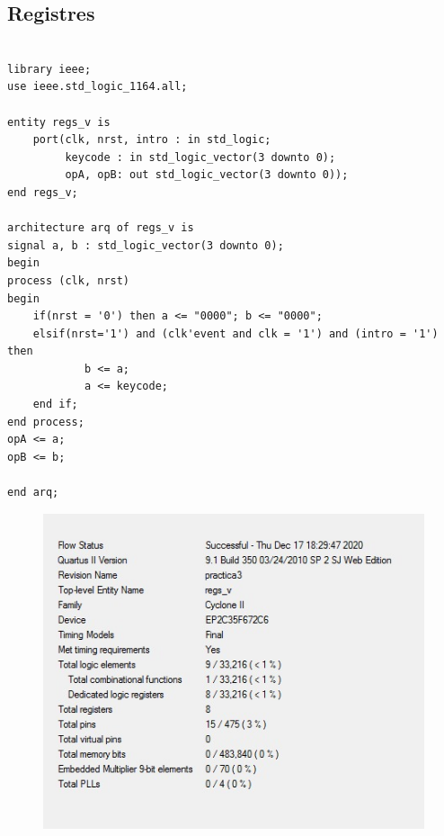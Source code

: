 \documentclass[12pt, a4papre]{article}
\begin{document}
		
\subsection{Registres}
		\begin{lstlisting}[style=vhdl, frame=single, basicstyle=\tiny]

library ieee;
use ieee.std_logic_1164.all;

entity regs_v is
	port(clk, nrst, intro : in std_logic;
		 keycode : in std_logic_vector(3 downto 0);
		 opA, opB: out std_logic_vector(3 downto 0));
end regs_v;

architecture arq of regs_v is
signal a, b : std_logic_vector(3 downto 0);
begin
process (clk, nrst)
begin 
	if(nrst = '0') then a <= "0000"; b <= "0000";
	elsif(nrst='1') and (clk'event and clk = '1') and (intro = '1') then
			b <= a;
			a <= keycode;
	end if;
end process;
opA <= a;
opB <= b;

end arq;

		\end{lstlisting}
		
			\begin{figure}[H]
		\begin{center}
		\includegraphics[width=130mm]{informeRegs.jpeg}
		\end{center}
	\end{figure}	

		
		
\end{document}
